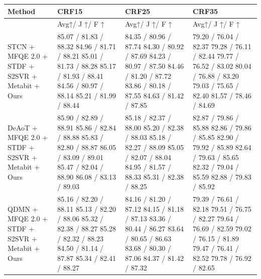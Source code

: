 \begin{tabular}{llll}
\toprule
Method & CRF15 & CRF25 & CRF35 \\
\midrule
 & Avg↑/ J ↑/ F ↑ & Avg↑/ J ↑/ F ↑ & Avg↑/ J ↑/ F ↑ \\
STCN + MFQE 2.0 + STDF + S2SVR + Metabit + Ours & 85.07 / 81.83 / 88.32 84.96 / 81.71 / 88.21 85.01 / 81.73 / 88.28 85.17 / 81.93 / 88.41 84.56 / 80.97 / 88.14 85.21 / 81.99 / 88.44 & 84.35 / 80.96 / 87.74 84.30 / 80.92 / 87.69 84.23 / 80.97 / 87.50 84.46 / 81.20 / 87.72 83.86 / 80.18 / 87.55 84.63 / 81.42 / 87.85 & 79.20 / 76.04 / 82.37 79.28 / 76.11 / 82.44 79.77 / 76.52 / 83.02 80.04 / 76.88 / 83.20 79.03 / 75.65 / 82.40 81.57 / 78.46 / 84.69 \\
DeAoT + MFQE 2.0 + STDF + S2SVR + Metabit + Ours & 85.90 / 82.89 / 88.91 85.86 / 82.84 / 88.88 85.83 / 82.80 / 88.87 86.05 / 83.09 / 89.01 85.47 / 82.04 / 88.90 86.08 / 83.13 / 89.03 & 85.18 / 82.37 / 88.00 85.20 / 82.38 / 88.03 85.18 / 82.27 / 88.09 85.05 / 82.07 / 88.04 84.95 / 81.57 / 88.33 85.31 / 82.38 / 88.25 & 82.87 / 79.86 / 85.88 82.86 / 79.86 / 85.85 82.90 / 79.92 / 85.89 82.64 / 79.63 / 85.65 82.32 / 79.04 / 85.59 82.88 / 79.83 / 85.92 \\
QDMN + MFQE 2.0 + STDF + S2SVR + Metabit + Ours & 85.16 / 82.20 / 88.11 85.13 / 82.20 / 88.06 85.32 / 82.38 / 88.27 85.28 / 82.32 / 88.23 84.50 / 81.14 / 87.87 85.34 / 82.41 / 88.27 & 84.16 / 81.20 / 87.12 84.15 / 81.18 / 87.13 83.36 / 80.44 / 86.27 83.64 / 80.65 / 86.63 83.68 / 80.30 / 87.06 84.37 / 81.42 / 87.32 & 79.39 / 76.61 / 82.18 79.51 / 76.75 / 82.27 79.64 / 76.69 / 82.59 79.02 / 76.15 / 81.89 79.47 / 76.41 / 82.52 79.78 / 76.92 / 82.65 \\
\bottomrule
\end{tabular}

